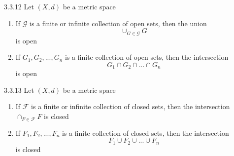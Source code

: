 \documentclass[a4paper,norsk]{article}
\begin{document}
\begin{propositionbox}{3.3.12}{}
Let $ \left( X, d \right)  $ be a metric space
\begin{enumerate}
  \item If $\mathcal{G}$ is a finite or infinite collection of open sets, then the union
  \[
      \cup_{G \in \mathcal{G}} G
  \]
  is open
  \item If $ G_1, G_2, ..., G_n $ is a finite collection of open sets, then the intersection 
  \[
      G_1 \cap G_2 \cap ... \cap G_n
  \]
  is open
\end{enumerate}
\end{propositionbox}


\begin{propositionbox}{3.3.13}{}
Let $ \left( X, d \right)  $ be a metric space
\begin{enumerate}
  \item If $ \mathcal{F} $ is a finite or infinite collection of closed sets, then the intersection $ \cap_{F \in \mathcal{F}} F $ is closed
  \item If $ F_1, F_2, ..., F_n $ is a finite collection of closed sets, then the intersection 
  \[
      F_1 \cup F_2 \cup ... \cup F_n
  \]
  is closed
\end{enumerate}
\end{propositionbox}
\end{document}
